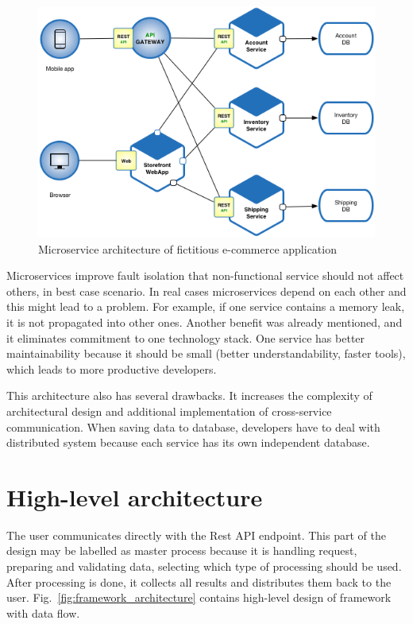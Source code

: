 \begin{figure}[H]
    \centering
    \includegraphics[width=.7\linewidth]{other-fig/microservice_architecture.png}
    \caption{Microservice architecture of fictitious e-commerce application}
    \label{fig:microservice_architecture}
\end{figure}

Microservices improve fault isolation that non-functional service should not affect others, in best case scenario. In real cases microservices depend on each other and this might lead to a problem. For example, if one service contains a memory leak, it is not propagated into other ones. Another benefit was already mentioned, and it eliminates commitment to one technology stack. One service has better maintainability because it should be small (better understandability, faster tools), which leads to more productive developers.~\cite{ MicroserviceArchitecture}

This architecture also has several drawbacks. It increases the complexity of architectural design and additional implementation of cross-service communication. When saving data to database, developers have to deal with distributed system because each service has its own independent database.~\cite{ MicroserviceArchitecture}

\section{High-level architecture}

The user communicates directly with the Rest API endpoint. This part of the design may be labelled as master process because it is handling request, preparing and validating data, selecting which type of processing should be used. After processing is done, it collects all results and distributes them back to the user. Fig.~\ref{fig:framework_architecture} contains high-level design of framework with data flow.

